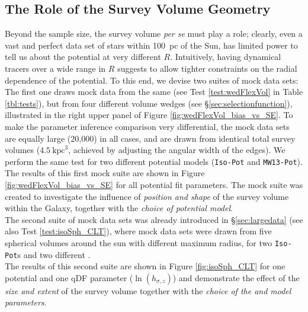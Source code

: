 \subsection{The Role of the Survey Volume Geometry} \label{sec:results_obsvolume}

Beyond the sample size, the survey volume {\it per se} must play a role; clearly, even a vast and perfect data set of stars within 100~pc of the Sun, has limited power to tell us about the potential at very different $R$. Intuitively, having dynamical tracers over a wide range in $R$ suggests to allow tighter constraints on the radial dependence of the potential. To this end, we devise two suites of mock data sets: 
\\The first one draws mock data from the same \pmodel (see Test \ref{test:wedFlexVol} in Table \ref{tbl:tests}), but from four different volume wedges (see \S\ref{sec:selectionfunction}), illustrated in the right upper panel of Figure \ref{fig:wedFlexVol_bias_vs_SE}. To make the parameter inference comparison very differential, the mock data sets are equally large (20,000) in all cases, and are drawn from identical total survey volumes ($4.5~\text{kpc}^3$, achieved by adjusting the angular width of the edges). We perform the same test for two different potential models (\texttt{Iso-Pot} and \texttt{MW13-Pot}).
\\The results of this first mock suite are shown in Figure \ref{fig:wedFlexVol_bias_vs_SE} for all potential fit parameters. The mock suite was created to investigate the influence of \emph{position and shape} of the survey volume within the Galaxy, together with the \emph{choice of potential model}. 
\\The second suite of mock data sets was already introduced in \S\ref{sec:largedata} (see also Test \ref{test:isoSph_CLT}), where mock data sets were drawn from five spherical volumes around the sun with different maximum radius, for two \texttt{Iso-Pot}s and two different \MAPs{}.
\\The results of this second suite are shown in Figure \ref{fig:isoSph_CLT} for one potential and one qDF parameter ($\ln(h_{\sigma,z})$) and demonstrate the effect of the \emph{size and extent} of the survey volume together with the \emph{choice of the \MAP{} and model parameters}.

